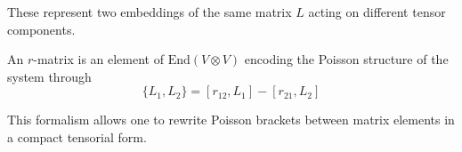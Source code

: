 These represent two embeddings of the same matrix $L$ acting on different tensor components.

\medskip

An $r$-matrix is an element of $\mathrm{End}(V \otimes V)$ encoding the Poisson structure of the system through
\begin{equation}
    \{L_1, L_2\} = [r_{12}, L_1] - [r_{21}, L_2]
\end{equation}

This formalism allows one to rewrite Poisson brackets between matrix elements in a compact tensorial form.